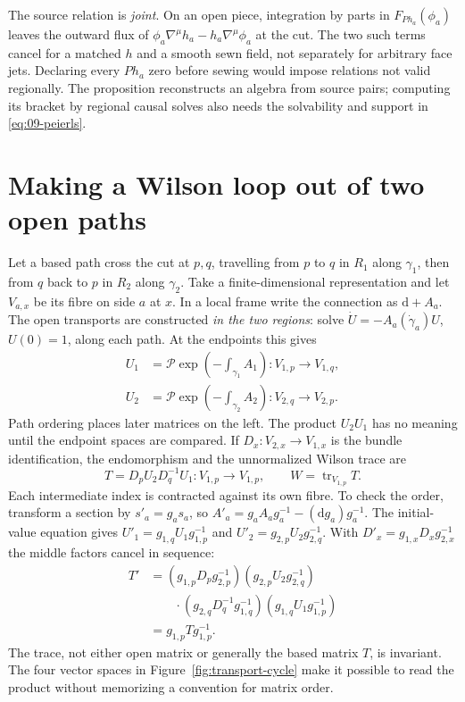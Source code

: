 The source relation is \emph{joint}. On an open piece, integration by parts in $F_{P h_a}(\phi_a)$ leaves the outward flux of $\phi_a\nabla^\mu h_a-h_a\nabla^\mu\phi_a$ at the cut. The two such terms cancel for a matched $h$ and a smooth sewn field, not separately for arbitrary face jets. Declaring every $P h_a$ zero before sewing would impose relations not valid regionally. The proposition reconstructs an algebra from source pairs; computing its bracket by regional causal solves also needs the solvability and support in \eqref{eq:09-peierls}.

\section{Making a Wilson loop out of two open paths}

Let a based path cross the cut at $p,q$, travelling from $p$ to $q$ in $R_1$ along $\gamma_1$, then from $q$ back to $p$ in $R_2$ along $\gamma_2$. Take a finite-dimensional representation and let $V_{a,x}$ be its fibre on side $a$ at $x$. In a local frame write the connection as $\mathrm{d}+A_a$. The open transports are constructed \emph{in the two regions}: solve $\dot U=-A_a(\dot\gamma_a)U$, $U(0)=1$, along each path. At the endpoints this gives
\begin{align*}
 U_1&=\mathcal P\exp\!\left(-\int_{\gamma_1}A_1\right):V_{1,p}\to V_{1,q},\\
 U_2&=\mathcal P\exp\!\left(-\int_{\gamma_2}A_2\right):V_{2,q}\to V_{2,p} .
\end{align*}
Path ordering places later matrices on the left. The product $U_2U_1$ has no meaning until the endpoint spaces are compared. If $D_x:V_{2,x}\to V_{1,x}$ is the bundle identification, the endomorphism and the unnormalized Wilson trace are
\begin{equation}
 T=D_p U_2 D_q^{-1} U_1:V_{1,p}\longrightarrow V_{1,p},
 \qquad W=\operatorname{tr}_{V_{1,p}}T .
 \label{eq:09-cross-loop}
\end{equation}
Each intermediate index is contracted against its own fibre. To check the order, transform a section by $s'_a=g_a s_a$, so $A'_a=g_a A_a g_a^{-1}-(\mathrm{d}g_a)g_a^{-1}$. The initial-value equation gives $U'_1=g_{1,q}U_1g_{1,p}^{-1}$ and $U'_2=g_{2,p}U_2g_{2,q}^{-1}$. With $D'_x=g_{1,x}D_xg_{2,x}^{-1}$ the middle factors cancel in sequence:
\begin{align*}
 T'&=(g_{1,p}D_pg_{2,p}^{-1})(g_{2,p}U_2g_{2,q}^{-1})\\[-1mm]
   &\qquad\cdot(g_{2,q}D_q^{-1}g_{1,q}^{-1})(g_{1,q}U_1g_{1,p}^{-1})\\
   &=g_{1,p}Tg_{1,p}^{-1} .
\end{align*}
The trace, not either open matrix or generally the based matrix $T$, is invariant. The four vector spaces in Figure~\ref{fig:transport-cycle} make it possible to read the product without memorizing a convention for matrix order.

